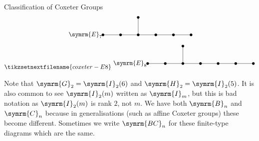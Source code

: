 \documentclass[fleqn]{NotesClass}
\newcommand{\dynkin}[2]{\symrm{#1}_{#2}}
\begin{document}
\begin{thm}{Classification of Coxeter Groups}{}
\begin{gather}
            \begin{tikzpicture}
                \node at (-1, 0) {\(\dynkin{E}{7}\)};
                \fill (0, 0) circle [radius=0.075cm];
                \fill (1, 0) circle [radius=0.075cm];
                \fill (2, 0) circle [radius=0.075cm];
                \fill (3, 0) circle [radius=0.075cm];
                \fill (4, 0) circle [radius=0.075cm];
                \fill (5, 0) circle [radius=0.075cm];
                \fill (2, 1) circle [radius=0.075cm];
                \draw (0, 0) -- (5, 0);
                \draw (2, 0) -- (2, 1);
            \end{tikzpicture}
            \\
            \tikzsetnextfilename{coxeter-E8}
            \begin{tikzpicture}
                \node at (-1, 0) {\(\dynkin{E}{8}\)};
                \fill (0, 0) circle [radius=0.075cm];
                \fill (1, 0) circle [radius=0.075cm];
                \fill (2, 0) circle [radius=0.075cm];
                \fill (3, 0) circle [radius=0.075cm];
                \fill (4, 0) circle [radius=0.075cm];
                \fill (5, 0) circle [radius=0.075cm];
                \fill (6, 0) circle [radius=0.075cm];
                \fill (2, 1) circle [radius=0.075cm];
                \draw (0, 0) -- (6, 0);
                \draw (2, 0) -- (2, 1);
            \end{tikzpicture}
        \end{gather}
    \end{thm}
    
    Note that \(\dynkin{G}{2} = \dynkin{I}{2}(6)\) and \(\dynkin{H}{2} = \dynkin{I}{2}(5)\).
    It is also common to see \(\dynkin{I}{2}(m)\) written as \(\dynkin{I}{m}\), but this is bad notation as \(\dynkin{I}{2}(m)\) is rank \(2\), not \(m\).
    We have both \(\dynkin{B}{n}\) and \(\dynkin{C}{n}\) because in generalisations (such as affine Coxeter groups) these become different.
    Sometimes we write \(\dynkin{BC}{n}\) for these finite-type diagrams which are the same.
    
\end{document}
